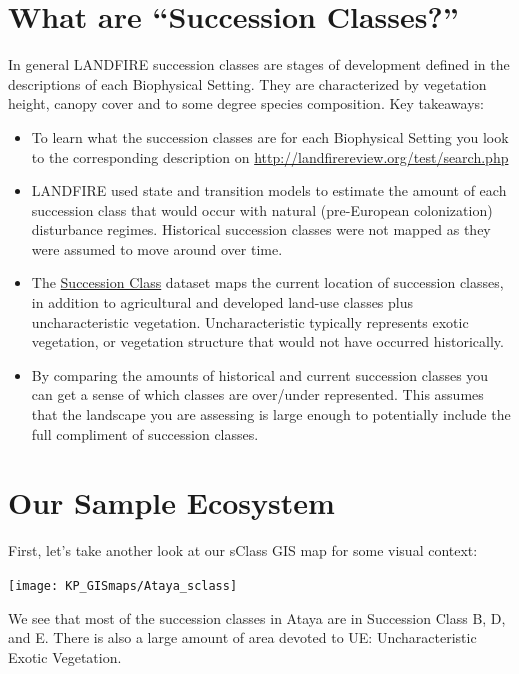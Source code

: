 \documentclass[
]{book}
\providecommand{\tightlist}{%
  \setlength{\itemsep}{0pt}\setlength{\parskip}{0pt}}
\begin{document}
\hypertarget{what-are-succession-classes}{%
\section{What are ``Succession Classes?''}\label{what-are-succession-classes}}

In general LANDFIRE succession classes are stages of development defined in the descriptions of each Biophysical Setting. They are characterized by vegetation height, canopy cover and to some degree species composition. Key takeaways:

\begin{itemize}
\tightlist
\item
  To learn what the succession classes are for each Biophysical Setting you look to the corresponding description on \url{http://landfirereview.org/test/search.php}
\item
  LANDFIRE used state and transition models to estimate the amount of each succession class that would occur with natural (pre-European colonization) disturbance regimes. Historical succession classes were not mapped as they were assumed to move around over time.
\item
  The \href{https://www.landfire.gov/sclass.php}{Succession Class} dataset maps the current location of succession classes, in addition to agricultural and developed land-use classes plus uncharacteristic vegetation. Uncharacteristic typically represents exotic vegetation, or vegetation structure that would not have occurred historically.
\item
  By comparing the amounts of historical and current succession classes you can get a sense of which classes are over/under represented. This assumes that the landscape you are assessing is large enough to potentially include the full compliment of succession classes.
\end{itemize}

\hypertarget{our-sample-ecosystem}{%
\section{Our Sample Ecosystem}\label{our-sample-ecosystem}}

First, let's take another look at our sClass GIS map for some visual context:

\texttt{[image: KP\_GISmaps/Ataya\_sclass]}

We see that most of the succession classes in Ataya are in Succession Class B, D, and E. There is also a large amount of area devoted to UE: Uncharacteristic Exotic Vegetation.
\end{document}
